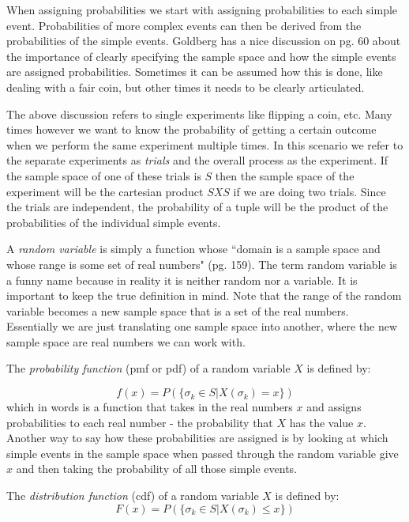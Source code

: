 When assigning probabilities we start with assigning probabilities to each simple event. Probabilities of more complex events can then be derived from the probabilities of the simple events. Goldberg has a nice discussion on pg. 60 about the importance of clearly specifying the sample space and how the simple events are assigned probabilities. Sometimes it can be assumed how this is done, like dealing with a fair coin, but other times it needs to be clearly articulated.

The above discussion refers to single experiments like flipping a coin, etc. Many times however we want to know the probability of getting a certain outcome when we perform the same experiment multiple times. In this scenario we refer to the separate experiments as \emph{trials} and the overall process as the experiment. If the sample space of one of these trials is $S$ then the sample space of the experiment will be the cartesian product $SXS$ if we are doing two trials. Since the trials are independent, the probability of a tuple will be the product of the probabilities of the individual simple events. 

A \emph{random variable} is simply a function whose ``domain is a sample space and whose range is some set of real numbers" (pg. 159). The term random variable is a funny name because in reality it is neither random nor a variable. It is important to keep the true definition in mind. Note that the range of the random variable becomes a new sample space that is a set of the real numbers. Essentially we are just translating one sample space into another, where the new sample space are real numbers we can work with. 

The \emph{probability function} (pmf or pdf) of a random variable $X$ is defined by:

\begin{equation}
f(x) = P(\{\sigma_k \in S | X(\sigma_k) = x\})
\end{equation}
\noindent which in words is a function that takes in the real numbers $x$ and assigns probabilities to each real number - the probability that $X$ has the value $x$. Another way to say how these probabilities are assigned is by looking at which simple events in the sample space when passed through the random variable give $x$ and then taking the probability of all those simple events.

The \emph{distribution function} (cdf) of a random variable $X$ is defined by:
\begin{equation}
F(x) = P(\{\sigma_k \in S | X(\sigma_k) \leq x\})
\end{equation}


